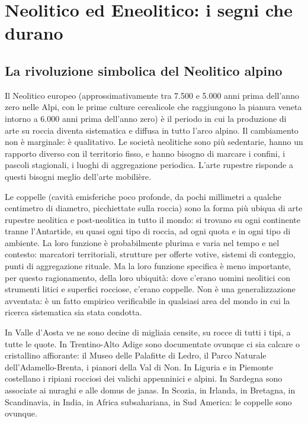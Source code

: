 \section{Neolitico ed Eneolitico: i segni che durano}

\subsection{La rivoluzione simbolica del Neolitico alpino}

Il Neolitico europeo (approssimativamente tra 7.500 e 5.000 anni prima dell'anno zero nelle Alpi, con le prime culture cerealicole che raggiungono la pianura veneta intorno a 6.000 anni prima dell'anno zero) è il periodo in cui la produzione di arte su roccia diventa sistematica e diffusa in tutto l'arco alpino. Il cambiamento non è marginale: è qualitativo. Le società neolitiche sono più sedentarie, hanno un rapporto diverso con il territorio fisso, e hanno bisogno di marcare i confini, i pascoli stagionali, i luoghi di aggregazione periodica. L'arte rupestre risponde a questi bisogni meglio dell'arte mobilière.

Le coppelle (cavità emisferiche poco profonde, da pochi millimetri a qualche centimetro di diametro, picchiettate sulla roccia) sono la forma più ubiqua di arte rupestre neolitica e post-neolitica in tutto il mondo: si trovano su ogni continente tranne l'Antartide, su quasi ogni tipo di roccia, ad ogni quota e in ogni tipo di ambiente. La loro funzione è probabilmente plurima e varia nel tempo e nel contesto: marcatori territoriali, strutture per offerte votive, sistemi di conteggio, punti di aggregazione rituale. Ma la loro funzione specifica è meno importante, per questo ragionamento, della loro ubiquità: dove c'erano uomini neolitici con strumenti litici e superfici rocciose, c'erano coppelle. Non è una generalizzazione avventata: è un fatto empirico verificabile in qualsiasi area del mondo in cui la ricerca sistematica sia stata condotta.

In Valle d'Aosta ve ne sono decine di migliaia censite, su rocce di tutti i tipi, a tutte le quote. In Trentino-Alto Adige sono documentate ovunque ci sia calcare o cristallino affiorante: il Museo delle Palafitte di Ledro, il Parco Naturale dell'Adamello-Brenta, i pianori della Val di Non. In Liguria e in Piemonte costellano i ripiani rocciosi dei valichi appenninici e alpini. In Sardegna sono associate ai nuraghi e alle domus de janas. In Scozia, in Irlanda, in Bretagna, in Scandinavia, in India, in Africa subsahariana, in Sud America: le coppelle sono ovunque.

